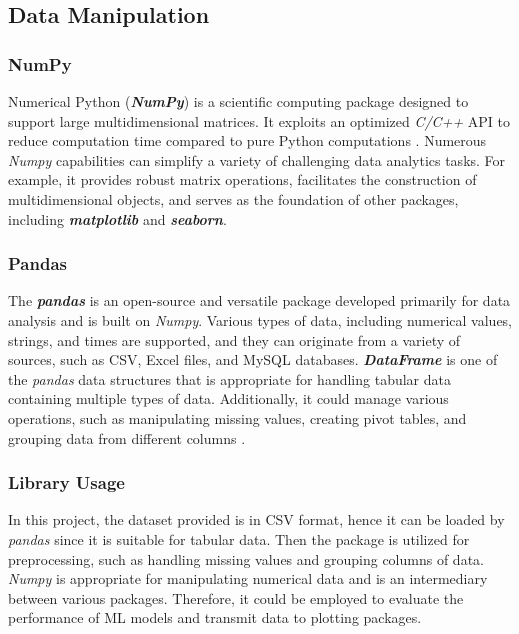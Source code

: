 \documentclass[12pt,twoside]{report}
\begin{document}
\subsection{Data Manipulation}
\subsubsection{NumPy}
Numerical Python (\textit{\textbf{NumPy}}) is a scientific computing package designed to support large multidimensional matrices. It exploits an optimized \textit{C/C++} API to reduce computation time compared to pure Python computations \citep{RN6}. Numerous \textit{Numpy} capabilities can simplify a variety of challenging data analytics tasks. For example, it provides robust matrix operations, facilitates the construction of multidimensional objects, and serves as the foundation of other packages, including \textbf{\textit{matplotlib}} and \textbf{\textit{seaborn}}.

\subsubsection{Pandas}
The \textbf{\textit{pandas}} is an open-source and versatile package developed primarily for data analysis and is built on \textit{Numpy}. Various types of data, including numerical values, strings, and times are supported, and they can originate from a variety of sources, such as CSV, Excel files, and MySQL databases. \textbf{\textit{DataFrame}} is one of the \textit{pandas} data structures that is appropriate for handling tabular data containing multiple types of data. Additionally, it could manage various operations, such as manipulating missing values, creating pivot tables, and grouping data from different columns \citep{RN4}. 

\subsubsection{Library Usage}
In this project, the dataset provided is in CSV format, hence it can be loaded by \textit{pandas} since it is suitable for tabular data. Then the package is utilized for preprocessing, such as handling missing values and grouping columns of data. 
\\

\textit{Numpy} is appropriate for manipulating numerical data and is an intermediary between various packages. Therefore, it could be employed to evaluate the performance of ML models and transmit data to plotting packages. 
\end{document}
